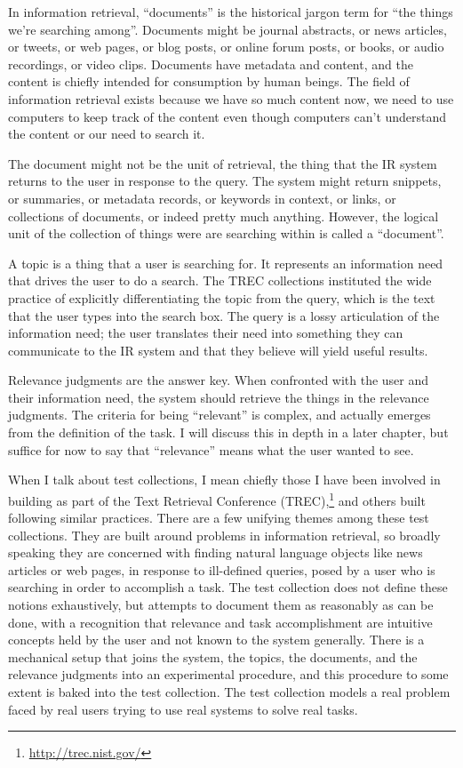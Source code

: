 \documentclass[nobib]{tufte-book}
\begin{document}
In information retrieval, ``documents'' is the historical jargon term for ``the things we're searching among''.  Documents might be journal abstracts, or news articles, or tweets, or web pages, or blog posts, or online forum posts, or books, or audio recordings, or video clips.  Documents have metadata and content, and the content is chiefly intended for consumption by human beings.  The field of information retrieval exists because we have so much content now, we need to use computers to keep track of the content even though computers can't understand the content or our need to search it.

The document might not be the unit of retrieval, the thing that the IR system returns to the user in response to the query.  The system might return snippets, or summaries, or metadata records, or keywords in context, or links, or collections of documents, or indeed pretty much anything.  However, the logical unit of the collection of things were are searching within is called a ``document''.

A topic is a thing that a user is searching for.  It represents an information need that drives the user to do a search.  The TREC collections instituted the wide practice of explicitly differentiating the topic from the query, which is the text that the user types into the search box. The query is a lossy articulation of the information need; the user translates their need into something they can communicate to the IR system and that they believe will yield useful results.

Relevance judgments are the answer key.  When confronted with the user and their information need, the system should retrieve the things in the relevance judgments.  The criteria for being ``relevant'' is complex, and actually emerges from the definition of the task.  I will discuss this in depth in a later chapter, but suffice for now to say that ``relevance'' means what the user wanted to see.

When I talk about test collections, I mean chiefly those I have been involved in building as part of the Text Retrieval Conference (TREC),\footnote{\url{http://trec.nist.gov/}} and others built following similar practices.  There are a few unifying themes among these test collections.  They are built around problems in information retrieval, so broadly speaking they are concerned with finding natural language objects like news articles or web pages, in response to ill-defined queries, posed by a user who is searching in order to accomplish a task.  The test collection does not define these notions exhaustively, but attempts to document them as reasonably as can be done, with a recognition that relevance and task accomplishment are intuitive concepts held by the user and not known to the system generally.  There is a mechanical setup that joins the system, the topics, the documents, and the relevance judgments into an experimental procedure, and this procedure to some extent is baked into the test collection.  The test collection models a real problem faced by real users trying to use real systems to solve real tasks.
\end{document}
